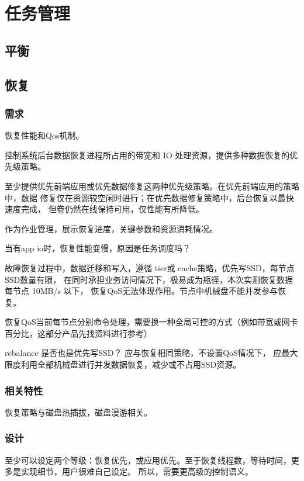 \chapter{任务管理}

\section{平衡}

\section{恢复}

\subsection{需求}

恢复性能和Qos机制。

控制系统后台数据恢复进程所占用的带宽和 IO 处理资源，提供多种数据恢复的优先级策略。

至少提供优先前端应用或优先数据修复这两种优先级策略。在优先前端应用的策略中，数据
修复仅在资源较空闲时进行；在优先数据修复策略中，后台恢复以最快速度完成，
但卷仍然在线保持可用，仅性能有所降低。

作为作业管理，展示恢复进度，关键参数和资源消耗情况。

当有app io时，恢复性能变慢，原因是任务调度吗？

故障恢复过程中，数据迁移和写入，遵循 tier或 cache策略，优先写SSD，每节点SSD数量有限，
在同时承担业务访问情况下，极易成为瓶径，本次实测恢复数据每节点 10MB/s 以下，
恢复QoS无法体现作用。节点中机械盘不能并发参与恢复。

恢复QoS当前每节点分别命令处理，需要换一种全局可控的方式（例如带宽或网卡百分比，这部分产品先找资料进行参考）

rebalance 是否也是优先写SSD？ 应与恢复相同策略，不设置QoS情况下，
应最大限度利用全部机械盘进行并发数据恢复，减少或不占用SSD资源。

\subsection{相关特性}

恢复策略与磁盘热插拔，磁盘漫游相关。

\subsection{设计}

至少可以设定两个等级：恢复优先，或应用优先。至于恢复线程数，等待时间，更多是实现细节，用户很难自己设定。
所以，需要更高级的控制语义。

